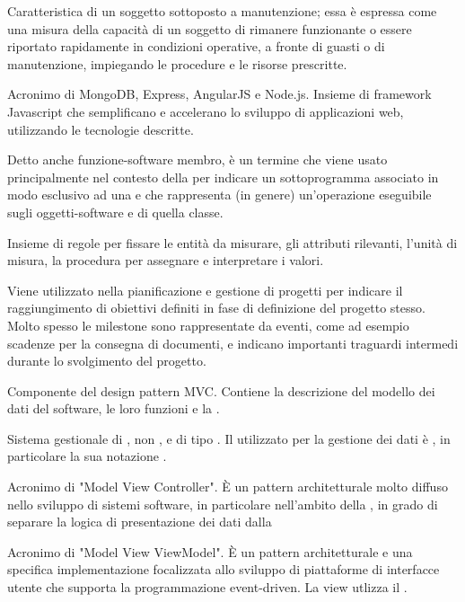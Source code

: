 {Caratteristica di un soggetto sottoposto a manutenzione; essa è espressa come una misura della capacità di un soggetto di rimanere funzionante o essere riportato rapidamente in condizioni operative, a fronte di guasti o di manutenzione, impiegando le procedure e le risorse prescritte. }

{Acronimo di MongoDB, Express, AngularJS e Node.js. Insieme di framework Javascript che semplificano e accelerano lo sviluppo di applicazioni web, utilizzando le tecnologie descritte.}

{Detto anche funzione-software membro, è un termine che viene usato principalmente nel contesto della   per indicare un sottoprogramma associato in modo esclusivo ad una  e che rappresenta (in genere) un'operazione eseguibile sugli oggetti-software e  di quella classe.}

{Insieme di regole per fissare le entità da misurare, gli attributi rilevanti, l'unità di misura, la procedura per assegnare e interpretare i valori.}

{Viene utilizzato nella pianificazione e gestione di progetti per indicare il raggiungimento di obiettivi definiti in fase di definizione del progetto stesso. Molto spesso le milestone sono rappresentate da eventi, come ad esempio scadenze per la consegna di documenti, e indicano importanti traguardi intermedi durante lo svolgimento del progetto.}

{Componente del design pattern MVC. Contiene la descrizione del modello dei dati del software, le loro funzioni e la .}

{Sistema gestionale di , non ,  e di tipo . Il  utilizzato per la gestione dei dati è , in particolare la sua notazione .}

{Acronimo di "Model View Controller". \`{E} un pattern architetturale molto diffuso nello sviluppo di sistemi software, in particolare nell'ambito della , in grado di separare la logica di presentazione dei dati dalla }

{Acronimo di "Model View ViewModel". \`{E} un pattern architetturale e una specifica implementazione focalizzata allo sviluppo di piattaforme di interfacce utente che supporta la programmazione event-driven. La view utlizza il .}
